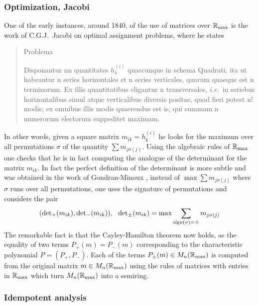 \documentclass[12pt]{article}
\def\R{{\mathbb R}}
\newcommand{\ie}{{\it i.e.\/}\ }
\def\rma{\R_{\rm max}}
\begin{document}
\subsubsection{Optimization, Jacobi}
One of the early instances, around 1840, of the use of matrices over $\R_{\rm max}$ is the work of C.G.J.~Jacobi \cite{Jacobi} on optimal assignment problems, where he states 
\begin{quote}{\it \centerline{Problema}
Disponantur nn quantitates $h_k^{(i)}$ quaecunque in schema Quadrati, ita ut habeantur n series horizontales et n series verticales, quarum quaeque est n terminorum. Ex illis quantitatibus eligantur n transversales, \ie in seriebus horizontalibus simul atque verticalibus diversis positae, quod fieri potest n! modis; ex omnibus illis modis quaerendus est is, qui summam n numerorum electorum suppeditet maximam.
}\end{quote}
In other words, given a square matrix $m_{ik}=h_k^{(i)}$ he looks for the maximum over all  permutations $\sigma$  
of the quantity $\sum m_{j\sigma(j)}$. Using the algebraic rules of $\rma$ one checks that he is in fact computing the analogue of the determinant for the matrix $m_{ik}$. In fact the perfect definition of the determinant is more subtle and was obtained   
 in the work of Gondran-Minoux \cite{GM1}, instead of $\max\sum m_{j\sigma(j)}$ where $\sigma$ runs over all permutations,  one uses the signature of permutations and considers the pair $$({\rm det}_+(m_{ik}),{\rm det}_-(m_{ik})), \  \  {\rm det}_\pm(m_{ik})=\max \sum_{{\rm sign}(\sigma)=\pm} m_{j\sigma(j)}$$  The remarkable fact is that the Cayley-Hamilton theorem now holds, as the equality of two terms $P_+(m)=P_-(m)$ corresponding to the characteristic polynomial $P=(P_+,P_-)$. Each of the terms $P_\pm(m)\in M_n(\rma)$ is computed from the original matrix $m\in M_n(\rma)$ using the rules of matrices with entries in $\rma$ which turn $M_n(\rma)$ into a semiring.
 


 

\subsubsection{Idempotent analysis}
\end{document}
